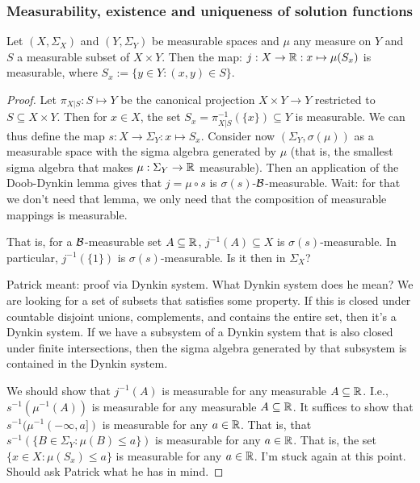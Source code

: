 \subsubsection{Measurability, existence and uniqueness of solution functions}

\begin{Lem}
Let $(X,\Sigma_X)$ and $(Y,\Sigma_Y)$ be measurable spaces and $\mu$ any measure on $Y$ and $S$ a measurable subset of $X \times Y$.
Then the map: $j: X \to \mathbb{R} : x \mapsto \mu(S_x)$ is measurable, where $S_x := \{ y \in Y : (x,y) \in S\}$.
\end{Lem}
\begin{proof}
Let $\pi_{X|S} : S \mapsto Y$ be the canonical projection $X \times Y \to Y$ restricted to $S \subseteq X \times Y$.
Then for $x \in X$, the set $S_x = \pi_{X|S}^{-1}(\{x\}) \subseteq Y$ is measurable.
We can thus define the map $s : X \to \Sigma_Y : x \mapsto S_x$.
Consider now $(\Sigma_Y,\sigma(\mu))$ as a measurable space with the sigma algebra generated by $\mu$ (that is, the smallest sigma algebra that makes $\mu : \Sigma_Y \to \mathbb{R}$ measurable).
Then an application of the Doob-Dynkin lemma gives that $j = \mu \circ s$ is $\sigma(s)$-$\mathcal{B}$-measurable.
Wait: for that we don't need that lemma, we only need that the composition of measurable mappings is measurable.

That is, for a $\mathcal{B}$-measurable set $A \subseteq \mathbb{R}$, $j^{-1}(A) \subseteq X$ is $\sigma(s)$-measurable.
In particular, $j^{-1}(\{1\})$ is $\sigma(s)$-measurable.
Is it then in $\Sigma_X$?

Patrick meant: proof via Dynkin system.
What Dynkin system does he mean?
We are looking for a set of subsets that satisfies some property.
If this is closed under countable disjoint unions, complements, and contains the entire set, then it's a Dynkin system.
If we have a subsystem of a Dynkin system that is also closed under finite intersections, then the sigma algebra generated by that subsystem is contained in the Dynkin system.

We should show that $j^{-1}(A)$ is measurable for any measurable $A \subseteq \mathbb{R}$.
I.e., $s^{-1}(\mu^{-1}(A))$ is measurable for any measurable $A \subseteq \mathbb{R}$.
It suffices to show that $s^{-1}(\mu^{-1}(-\infty,a])$ is measurable for any $a \in \mathbb{R}$.
That is, that $s^{-1}(\{B \in \Sigma_Y : \mu(B) \le a\})$ is measurable for any $a \in \mathbb{R}$.
That is, the set $\{x \in X: \mu(S_x) \le a\}$ is measurable for any $a \in \mathbb{R}$.
I'm stuck again at this point. 
Should ask Patrick what he has in mind.


\end{proof}

